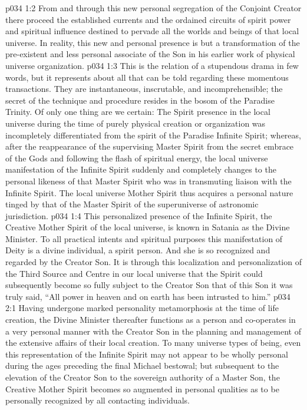 \vs p034 1:2 From and through this new personal segregation of the Conjoint Creator there proceed the established currents and the ordained circuits of spirit power and spiritual influence destined to pervade all the worlds and beings of that local universe. In reality, this new and personal presence is but a transformation of the pre\hyp{}existent and less personal associate of the Son in his earlier work of physical universe organization.
\vs p034 1:3 \pc This is the relation of a stupendous drama in few words, but it represents about all that can be told regarding these momentous transactions. They are instantaneous, inscrutable, and incomprehensible; the secret of the technique and procedure resides in the bosom of the Paradise Trinity. Of only one thing are we certain: The Spirit presence in the local universe during the time of purely physical creation or organization was incompletely differentiated from the spirit of the Paradise Infinite Spirit; whereas, after the reappearance of the supervising Master Spirit from the secret embrace of the Gods and following the flash of spiritual energy, the local universe manifestation of the Infinite Spirit suddenly and completely changes to the personal likeness of that Master Spirit who was in transmuting liaison with the Infinite Spirit. The local universe Mother Spirit thus acquires a personal nature tinged by that of the Master Spirit of the superuniverse of astronomic jurisdiction.
\vs p034 1:4 This personalized presence of the Infinite Spirit, the Creative Mother Spirit of the local universe, is known in Satania as the Divine Minister. To all practical intents and spiritual purposes this manifestation of Deity is a divine individual, a spirit person. And she is so recognized and regarded by the Creator Son. It is through this localization and personalization of the Third Source and Centre in our local universe that the Spirit could subsequently become so fully subject to the Creator Son that of this Son it was truly said, “All power in heaven and on earth has been intrusted to him.”
\vs p034 2:1 Having undergone marked personality metamorphosis at the time of life creation, the Divine Minister thereafter functions as a person and co\hyp{}operates in a very personal manner with the Creator Son in the planning and management of the extensive affairs of their local creation. To many universe types of being, even this representation of the Infinite Spirit may not appear to be wholly personal during the ages preceding the final Michael bestowal; but subsequent to the elevation of the Creator Son to the sovereign authority of a Master Son, the Creative Mother Spirit becomes so augmented in personal qualities as to be personally recognized by all contacting individuals.
